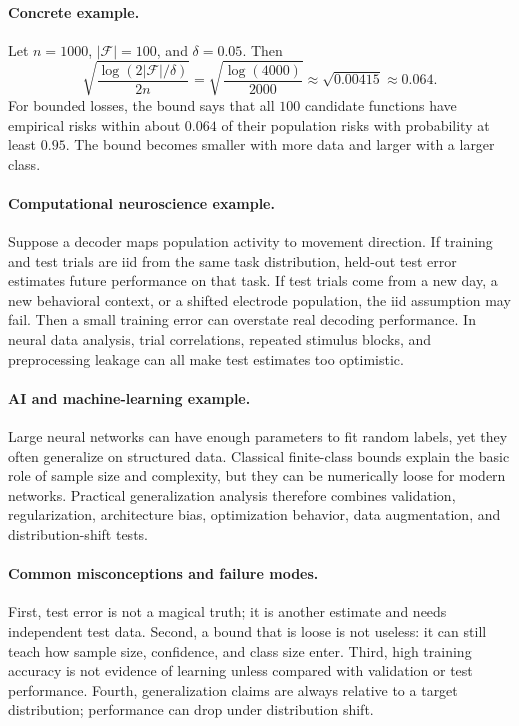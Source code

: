 \paragraph{Concrete example.}
Let \(n=1000\), \(|\mathcal F|=100\), and \(\delta=0.05\). Then
\[
\sqrt{\frac{\log(2|\mathcal F|/\delta)}{2n}}
=
\sqrt{\frac{\log(4000)}{2000}}
\approx
\sqrt{0.00415}
\approx 0.064.
\]
For bounded losses, the bound says that all \(100\) candidate functions have empirical risks within about \(0.064\) of their population risks with probability at least \(0.95\). The bound becomes smaller with more data and larger with a larger class.

\paragraph{Computational neuroscience example.}
Suppose a decoder maps population activity to movement direction. If training and test trials are iid from the same task distribution, held-out test error estimates future performance on that task. If test trials come from a new day, a new behavioral context, or a shifted electrode population, the iid assumption may fail. Then a small training error can overstate real decoding performance. In neural data analysis, trial correlations, repeated stimulus blocks, and preprocessing leakage can all make test estimates too optimistic.

\paragraph{AI and machine-learning example.}
Large neural networks can have enough parameters to fit random labels, yet they often generalize on structured data. Classical finite-class bounds explain the basic role of sample size and complexity, but they can be numerically loose for modern networks. Practical generalization analysis therefore combines validation, regularization, architecture bias, optimization behavior, data augmentation, and distribution-shift tests.

\paragraph{Common misconceptions and failure modes.}
First, test error is not a magical truth; it is another estimate and needs independent test data. Second, a bound that is loose is not useless: it can still teach how sample size, confidence, and class size enter. Third, high training accuracy is not evidence of learning unless compared with validation or test performance. Fourth, generalization claims are always relative to a target distribution; performance can drop under distribution shift.

